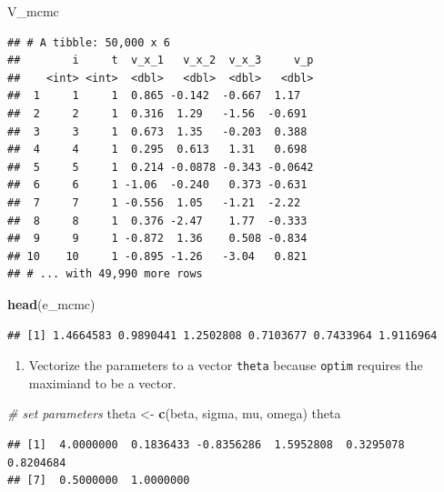 \documentclass[]{book}
\newenvironment{Shaded}{\begin{snugshade}}{\end{snugshade}}
\newcommand{\KeywordTok}[1]{\textcolor[rgb]{0.13,0.29,0.53}{\textbf{#1}}}
\newcommand{\StringTok}[1]{\textcolor[rgb]{0.31,0.60,0.02}{#1}}
\newcommand{\CommentTok}[1]{\textcolor[rgb]{0.56,0.35,0.01}{\textit{#1}}}
\newcommand{\NormalTok}[1]{#1}
\providecommand{\tightlist}{%
  \setlength{\itemsep}{0pt}\setlength{\parskip}{0pt}}
\begin{document}
\begin{Shaded}
\begin{Highlighting}[]
\NormalTok{V_mcmc}
\end{Highlighting}
\end{Shaded}

\begin{verbatim}
## # A tibble: 50,000 x 6
##        i     t  v_x_1   v_x_2  v_x_3     v_p
##    <int> <int>  <dbl>   <dbl>  <dbl>   <dbl>
##  1     1     1  0.865 -0.142  -0.667  1.17  
##  2     2     1  0.316  1.29   -1.56  -0.691 
##  3     3     1  0.673  1.35   -0.203  0.388 
##  4     4     1  0.295  0.613   1.31   0.698 
##  5     5     1  0.214 -0.0878 -0.343 -0.0642
##  6     6     1 -1.06  -0.240   0.373 -0.631 
##  7     7     1 -0.556  1.05   -1.21  -2.22  
##  8     8     1  0.376 -2.47    1.77  -0.333 
##  9     9     1 -0.872  1.36    0.508 -0.834 
## 10    10     1 -0.895 -1.26   -3.04   0.821 
## # ... with 49,990 more rows
\end{verbatim}

\begin{Shaded}
\begin{Highlighting}[]
\KeywordTok{head}\NormalTok{(e_mcmc)}
\end{Highlighting}
\end{Shaded}

\begin{verbatim}
## [1] 1.4664583 0.9890441 1.2502808 0.7103677 0.7433964 1.9116964
\end{verbatim}

\begin{enumerate}
\def\labelenumi{\arabic{enumi}.}
\setcounter{enumi}{1}
\tightlist
\item
  Vectorize the parameters to a vector \texttt{theta} because
  \texttt{optim} requires the maximiand to be a vector.
\end{enumerate}

\begin{Shaded}
\begin{Highlighting}[]
\CommentTok{# set parameters}
\NormalTok{theta <-}\StringTok{ }\KeywordTok{c}\NormalTok{(beta, sigma, mu, omega)}
\NormalTok{theta}
\end{Highlighting}
\end{Shaded}

\begin{verbatim}
## [1]  4.0000000  0.1836433 -0.8356286  1.5952808  0.3295078  0.8204684
## [7]  0.5000000  1.0000000
\end{verbatim}
\end{document}
